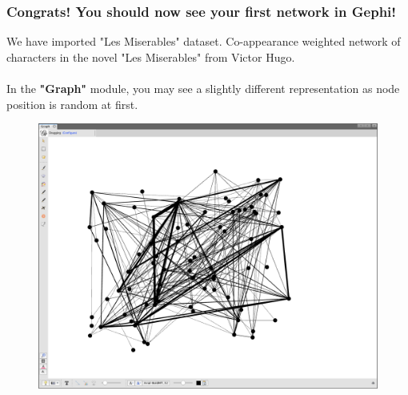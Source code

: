 \documentclass[10pt]{beamer}
\begin{document}

\begin{frame}
\frametitle{Congrats! You should now see your first network in Gephi!}

We have imported "Les Miserables" dataset. Co-appearance weighted network of
characters in the novel "Les Miserables" from Victor Hugo. \\~\\

In the \textbf{"Graph"} module, you may see a slightly different representation as node position is random at first.
\begin{figure}
\includegraphics[width=0.5\linewidth]{figures/initial_network.png}
\end{figure}
\end{frame}
\end{document}
